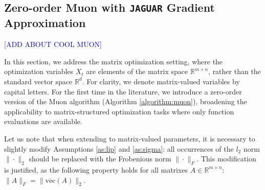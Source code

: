 \documentclass{article}
\theoremstyle{plain}
\theoremstyle{definition}
\theoremstyle{remark}
\begin{document}
\subsection{Zero-order Muon with \texttt{JAGUAR} Gradient Approximation}

\textcolor{blue}{[ADD ABOUT COOL MUON]}

In this section, we address the matrix optimization setting, where the optimization variables $X_t$ are elements of the matrix space $\mathbb{R}^{m \times n}$, rather than the standard vector space $\mathbb{R}^d$. For clarity, we denote matrix-valued variables by capital letters. For the first time in the literature, we introduce a zero-order version of the Muon algorithm (Algorithm \ref{algorithm:muon}), broadening the applicability to matrix-structured optimization tasks where only function evaluations are available.

Let us note that when extending to matrix-valued parameters, it is necessary to slightly modify Assumptions \ref{as:lip} and \ref{as:sigma}: all occurrences of the $l_2$ norm $\| \cdot \|_2$ should be replaced with the Frobenious norm $\| \cdot \|_F$. This modification is justified, as the following property holds for all matrixes $A \in \mathbb{R}^{m \times n}$: $\| A \|_F = \|\overline{\text{vec}}(A)\|_2$.
\end{document}
